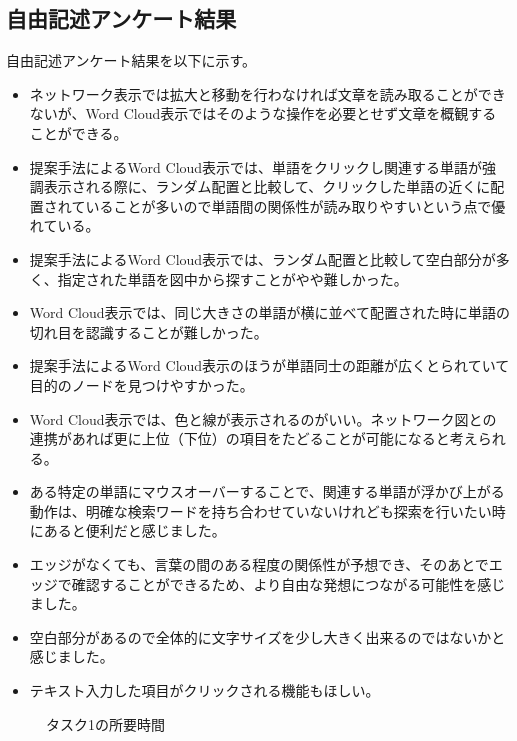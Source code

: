 \documentclass[syuuron]{kuee}
\begin{document}
		\subsection{自由記述アンケート結果}
		自由記述アンケート結果を以下に示す。
		\begin{itemize}
			\item ネットワーク表示では拡大と移動を行わなければ文章を読み取ることができないが、Word Cloud表示ではそのような操作を必要とせず文章を概観することができる。
			\item 提案手法によるWord Cloud表示では、単語をクリックし関連する単語が強調表示される際に、ランダム配置と比較して、クリックした単語の近くに配置されていることが多いので単語間の関係性が読み取りやすいという点で優れている。
			\item 提案手法によるWord Cloud表示では、ランダム配置と比較して空白部分が多く、指定された単語を図中から探すことがやや難しかった。
			\item Word Cloud表示では、同じ大きさの単語が横に並べて配置された時に単語の切れ目を認識することが難しかった。
			\item 提案手法によるWord Cloud表示のほうが単語同士の距離が広くとられていて目的のノードを見つけやすかった。
			\item Word Cloud表示では、色と線が表示されるのがいい。ネットワーク図との連携があれば更に上位（下位）の項目をたどることが可能になると考えられる。
			\item ある特定の単語にマウスオーバーすることで、関連する単語が浮かび上がる動作は、明確な検索ワードを持ち合わせていないけれども探索を行いたい時にあると便利だと感じました。
			\item エッジがなくても、言葉の間のある程度の関係性が予想でき、そのあとでエッジで確認することができるため、より自由な発想につながる可能性を感じました。
			\item 空白部分があるので全体的に文字サイズを少し大きく出来るのではないかと感じました。
			\item テキスト入力した項目がクリックされる機能もほしい。
		\end{itemize}
		\begin{figure}
			\begin{center}
			\end{center}
			\caption{タスク1の所要時間}
	  		\label{fig:res1}
		\end{figure}
\end{document}
